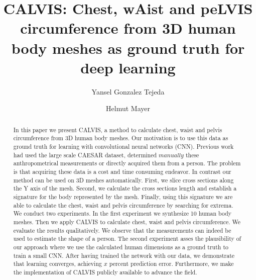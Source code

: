 \documentclass[runningheads]{llncs}
\begin{document}
%
\title{CALVIS: Chest, wAist and peLVIS circumference from 3D human body meshes	
as ground truth for deep learning}
%
%
\author{Yansel Gonzalez Tejeda \and
Helmut Mayer}
%
%
%
\maketitle              %
%
\begin{abstract}
In this paper we present CALVIS, a method to calculate chest, waist and 
pelvis circumference from 3D human body meshes. Our motivation is to use 
this data as ground truth for learning with convolutional neural networks 
(CNN). Previous work had used the large scale CAESAR dataset, determined 
$\textit{manually}$ these anthropometrical measurements or directly acquired 
them from a person. The problem is that acquiring these data is a cost and 
time consuming endeavor. In contrast our method can be used on 
3D meshes automatically. First, we slice cross sections along the Y axis of 
the mesh. Second, we calculate the cross sections length and establish a 
signature for the body represented by the mesh. Finally, using this 
signature we are able to calculate the chest, waist and pelvis 
circumference by searching for extrema. We conduct two experiments. 
In the first experiment we synthesize 10 human body meshes. Then we apply 
CALVIS to calculate chest, waist and pelvis circumference. We evaluate the 
results qualitatively. We observe that the measurements can indeed be used 
to estimate the shape of a person. The second experiment asses the 
plausibility of our approach where we use the calculated human dimensions as 
a ground truth to train a small CNN. After having trained the network with 
our data, we demonstrate that learning converges, achieving $x$ percent 
prediction error. 
Furthermore, we make the implementation of CALVIS publicly available to 
advance the field.

\end{abstract}
%
%
%
\end{document}
